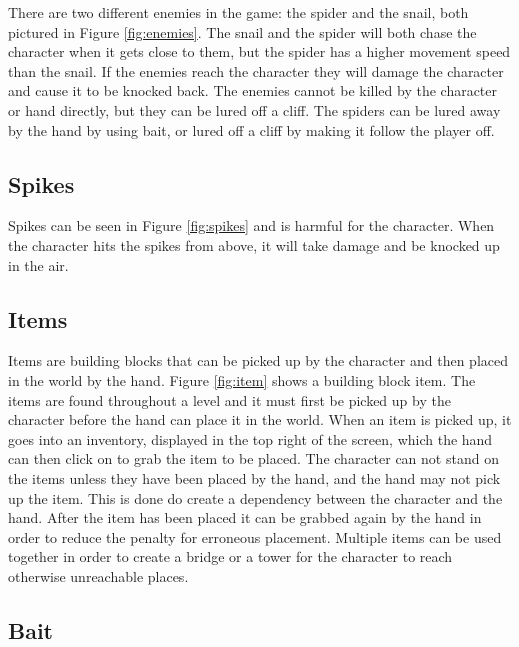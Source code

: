 There are two different enemies in the game: the spider and the snail, both pictured in Figure \ref{fig:enemies}. The snail and the spider will both chase the character when it gets close to them, but the spider has a higher movement speed than the snail. If the enemies reach the character they will damage the character and cause it to be knocked back. The enemies cannot be killed by the character or hand directly, but they can be lured off a cliff. The spiders can be lured away by the hand by using bait, or lured off a cliff by making it follow the player off.

\subsection{Spikes}


Spikes can be seen in Figure \ref{fig:spikes} and is harmful for the character. When the character hits the spikes from above, it will take damage and be knocked up in the air.

\subsection{Items}


Items are building blocks that can be picked up by the character and then placed in the world by the hand. Figure \ref{fig:item} shows a building block item. The items are found throughout a level and it must first be picked up by the character before the hand can place it in the world. When an item is picked up, it goes into an inventory, displayed in the top right of the screen, which the hand can then click on to grab the item to be placed. The character can not stand on the items unless they have been placed by the hand, and the hand may not pick up the item. This is done do create a dependency between the character and the hand. After the item has been placed it can be grabbed again by the hand in order to reduce the penalty for erroneous placement. Multiple items can be used together in order to create a bridge or a tower for the character to reach otherwise unreachable places.

\subsection{Bait}

